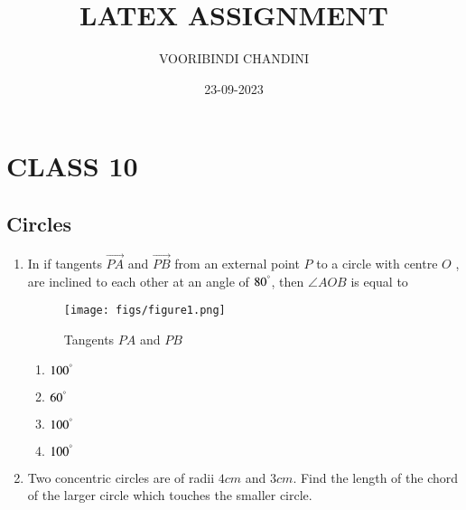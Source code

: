 \documentclass{article}
\theoremstyle{remark}
\begin{document}
\title{LATEX ASSIGNMENT}
\author{VOORIBINDI CHANDINI}
\date{23-09-2023}
\maketitle
\section*{CLASS 10} 
\subsection*{Circles}
\date{}
\maketitle

\begin{enumerate}[label=\arabic*.,ref=\theenumi]
    \item In  if tangents $\vec{PA}$ and $\vec{PB}$ from an external point $P$ to a circle with centre $O$ , are inclined to each other at an angle of $80^{\degree}$, then $\angle AOB$ is equal to
 \begin{figure}[H]
        \centering
        \texttt{[image: figs/figure1.png]}
        \caption{Tangents $PA$ and $PB$}
        \label{fig:fig1.png}
    \end{figure}
    \begin{enumerate}
        \item $100^{\degree}$
        \item $60^{\degree}$
        \item $100^{\degree}$
        \item $100^{\degree}$
    \end{enumerate}

    \item  Two concentric circles are of radii $4 cm$ and $3 cm$. Find the length of the chord of the larger circle which touches the smaller circle.


\end{enumerate}
\end{document}
